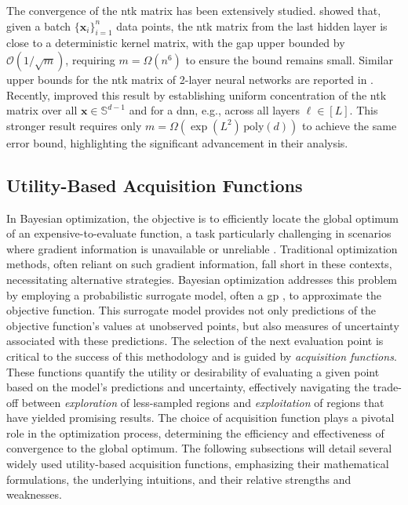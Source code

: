 The convergence of the \ac{ntk} matrix has been extensively studied. \citet{du2018gradient} showed that, given a batch \(\{\mathbf{x}_i\}_{i=1}^n\) data points, the \ac{ntk} matrix from the last hidden layer is close to a deterministic kernel matrix, with the gap upper bounded by $\mathcal{O}(1/\sqrt{m})$, requiring \(m = \Omega(n^6)\) to ensure the bound remains small. Similar upper bounds for the \ac{ntk} matrix of 2-layer neural networks are reported in \citet{song2019quadratic, munteanu2022bounding}. Recently, \citet{xu2024overparametrized} improved this result by establishing uniform concentration of the \ac{ntk} matrix over all \(\mathbf{x} \in \mathbb{S}^{d-1}\) and for a \ac{dnn}, e.g., across all layers \(\ell \in [L]\). This stronger result requires only \(m = \Omega(\exp(L^2) \, \mathrm{poly}(d))\) to achieve the same error bound, highlighting the significant advancement in their analysis.


 






\subsection{Utility-Based Acquisition Functions}
\label{section:acquisition_functions}

In Bayesian optimization, the objective is to efficiently locate the global optimum of an expensive-to-evaluate function, a task particularly challenging in scenarios where gradient information is unavailable or unreliable \citep{mockus1978application,jones1998efficient}. Traditional optimization methods, often reliant on such gradient information, fall short in these contexts, necessitating alternative strategies. Bayesian optimization addresses this problem by employing a probabilistic surrogate model, often a \acf{gp} \citep{rasmussen2006gaussian}, to approximate the objective function. This surrogate model provides not only predictions of the objective function's values at unobserved points, but also measures of uncertainty associated with these predictions. The selection of the next evaluation point is critical to the success of this methodology and is guided by \textit{acquisition functions}. These functions quantify the utility or desirability of evaluating a given point based on the model’s predictions and uncertainty, effectively navigating the trade-off between \textit{exploration} of less-sampled regions and \textit{exploitation} of regions that have yielded promising results.  The choice of acquisition function plays a pivotal role in the optimization process, determining the efficiency and effectiveness of convergence to the global optimum. The following subsections will detail several widely used utility-based acquisition functions, emphasizing their mathematical formulations, the underlying intuitions, and their relative strengths and weaknesses.
